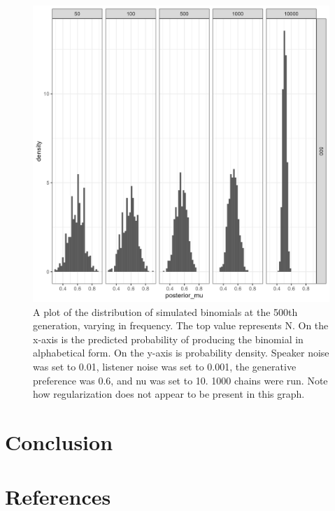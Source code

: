 \documentclass[
  jou,floatsintext]{apa6}
\begin{document}
\begin{figure}

{\centering \includegraphics[width=1\linewidth]{Figures/speaker_noise_01_listener_001} 

}

\caption{A plot of the distribution of simulated binomials at the 500th generation, varying in frequency. The top value represents N. On the x-axis is the predicted probability of producing the binomial in alphabetical form. On the y-axis is probability density. Speaker noise was set to 0.01, listener noise was set to 0.001, the generative preference was 0.6, and nu was set to 10. 1000 chains were run. Note how regularization does not appear to be present in this graph.}\label{fig:regularizationplot2}
\end{figure}

\section{Conclusion}\label{conclusion}

\newpage

\section{References}\label{references}
\end{document}
